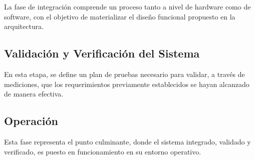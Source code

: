La fase de integración comprende un proceso tanto a nivel de hardware como de software, con el objetivo de materializar el diseño funcional propuesto en la arquitectura.

\subsection{Validación y Verificación del Sistema}

En esta etapa, se define un plan de pruebas necesario para validar, a través de mediciones, que los requerimientos previamente establecidos se hayan alcanzado de manera efectiva.

\subsection{Operación}

Esta fase representa el punto culminante, donde el sistema integrado, validado y verificado, es puesto en funcionamiento en su entorno operativo.
 










